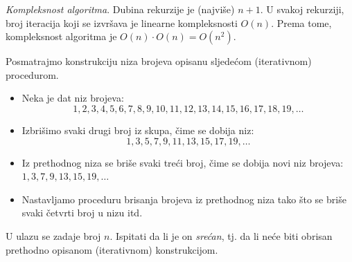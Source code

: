 \emph{Kompleksnost algoritma}. Dubina rekurzije je (najviše) $n+1$. U svakoj rekurziji, broj iteracija koji se izvršava je linearne kompleksnosti $O(n)$. Prema tome, kompleksnost algoritma je $O(n) \cdot O(n) = O(n^2)$. 


 
 Posmatrajmo konstrukciju niza brojeva opisanu sljedećom (iterativnom) procedurom.
 
 \begin{itemize}
 	\item Neka je dat niz brojeva:
 	$$1, 2, 3, 4, 5, 6, 7, 8, 9, 10, 11, 12, 13, 14, 15, 16, 17, 18, 19,\ldots $$
 	\item Izbrišimo svaki drugi broj iz skupa, čime se dobija niz:
 	$$1, 3, 5, 7, 9, 11, 13, 15, 17, 19,\ldots$$
 	\item Iz prethodnog niza se briše svaki treći broj, čime se dobija novi niz brojeva: $1, 3, 7, 9, 13, 15, 19,\ldots$
 	\item Nastavljamo proceduru brisanja brojeva iz prethodnog niza tako što se briše svaki četvrti broj u nizu itd.
 \end{itemize} 
 
 U ulazu se zadaje broj $n$. Ispitati da li je on \emph{srećan}, tj. da li neće biti obrisan prethodno opisanom (iterativnom) konstrukcijom. 
 
